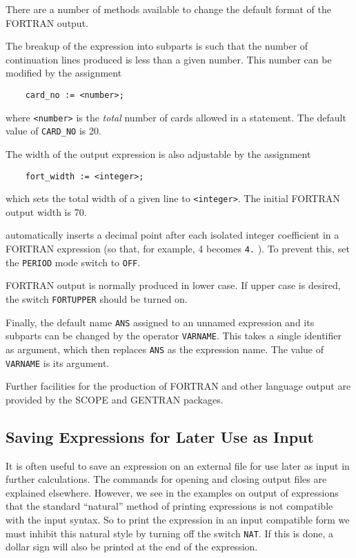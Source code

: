 There are a number of methods available to change the default format of the
FORTRAN output.

The breakup of the expression into subparts is such that the number of
continuation lines produced is less than a given number. This number can
be modified by the assignment
\begin{verbatim}
	card_no := <number>;
\end{verbatim}
where {\tt <number>} is the {\em total\/} number of cards allowed in a
statement. The default value of {\tt CARD\_NO} is 20.

The width of the output expression is also adjustable by the assignment
\begin{verbatim}
	fort_width := <integer>;
\end{verbatim}
 which sets the total width of a given line to
{\tt <integer>}.  The initial FORTRAN output width is 70.

{\REDUCE} automatically inserts a decimal point after each isolated integer
coefficient in a FORTRAN expression (so that, for example, 4 becomes
{\tt 4.} ). To prevent this, set the {\tt PERIOD}
mode switch to {\tt OFF}.

FORTRAN output is normally produced in lower case.  If upper case is desired,
the switch {\tt FORTUPPER} should be turned on.

Finally, the default name {\tt ANS} assigned to an unnamed expression and
its subparts can be changed by the operator {\tt VARNAME}.
  This takes a single identifier as argument, which then
replaces {\tt ANS} as the expression name.  The value of {\tt VARNAME} is
its argument.

Further facilities for the production of FORTRAN and other language output
are provided by the SCOPE and GENTRAN
packages.

\subsection{Saving Expressions for Later Use as Input}

It is often useful to save an expression on an external file for use later
as input in further calculations. The commands for opening and closing
output files are explained elsewhere. However, we see in the examples on
output of expressions that the standard ``natural'' method of printing
expressions is not compatible with the input syntax. So to print the
expression in an input compatible form we must inhibit this natural style
by turning off the switch {\tt NAT}. If this is done, a
dollar sign will also be printed at the end of the expression.

